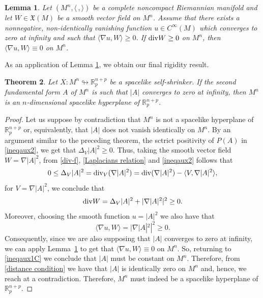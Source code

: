 \documentclass[leqno,11pt]{amsart}
\theoremstyle{plain}
\newtheorem{theorem}{\indent\sc Theorem}[section]
\newtheorem{lemma}[theorem]{\indent\sc Lemma}
\theoremstyle{definition}
\numberwithin{equation}{section}
\begin{document}
\begin{lemma}\label{lemma Alias-Caminha-Nascimento}
Let $(M^n,\langle\,,\rangle)$ be a complete noncompact Riemannian manifold and let $W\in\mathfrak{X}(M)$ be a smooth vector field on $M^n$. Assume that there exists a nonnegative, non-identically vanishing function $u\in C^{\infty}(M)$ which converges to zero at infinity and such that $\langle\nabla u,W\rangle\geq0$. If ${\rm div}W\geq0$ on $M^n$, then $\langle\nabla u,W\rangle\equiv0$ on $M^n$.
\end{lemma}

As an application of Lemma \ref{lemma Alias-Caminha-Nascimento}, we obtain our final rigidity result.


\begin{theorem}
	Let $X:M^n\looparrowright\mathbb R^{n+p}_p$ be a spacelike self-shrinker. If the second fundamental form $A$ of $M^n$ is such that $|A|$ converges to zero at infinity, then $M^n$ is an $n$-dimensional spacelike hyperplane of $\mathbb R^{n+p}_p$.
\end{theorem}

\begin{proof}
Let us suppose by contradiction that $M^n$ is not a spacelike hyperplane of $\mathbb R^{n+p}_{p}$ or, equivalently, that $|A|$ does not vanish identically on $M^n$. By an argument similar to the preceding theorem, the sctrict positivity of $P(A)$ in \eqref{ineqaux2}, we get that $\Delta_V |A|^2 \geq 0$. Thus, taking the smooth vector field $W=\nabla|A|^2$, from \eqref{div-f}, \eqref{Laplacians relation} and \eqref{ineqaux2} follows that
\begin{equation}\label{div X}
0\leq \Delta_V|A|^2 =  {\rm div}_V (\nabla |A|^2) = {\rm div}( \nabla |A|^2 ) - \langle V, \nabla |A|^2 \rangle,
\end{equation}
for $V=\nabla |A|^2$, we conclude that
\begin{equation}\label{divthm2}
{\rm div} W = \Delta_V |A|^2 + |\nabla |A|^2 |^2 \geq 0.
\end{equation}
Moreover, choosing the smooth function $u=|A|^2$ we also have that
\begin{equation}\label{ineqaux1C}
\langle\nabla u,W\rangle=|\nabla|A|^2|^2\geq0.
\end{equation}
Consequently, since we are also supposing that $|A|$ converges to zero at infinity, we can apply Lemma~\ref{lemma Alias-Caminha-Nascimento} to get that
$\langle\nabla u,W\rangle\equiv0$ on $M^n$. So, returning to \eqref{ineqaux1C} we conclude that $|A|$ must be constant on $M^n$. Therefore, from \eqref{distance condition} we have that $|A|$ is identically zero on $M^n$ and, hence, we reach at a contradiction. Therefore, $M^n$ must indeed be a spacelike hyperplane of $\mathbb{R}^{n+p}_p$.
\end{proof}
\end{document}
